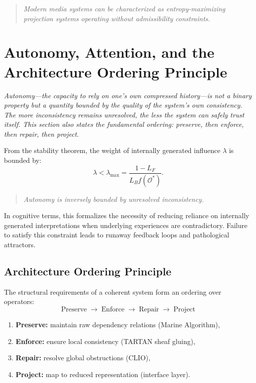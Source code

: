 \documentclass[12pt,a4paper]{article}
\begin{document}
\begin{quote}
\emph{Modern media systems can be characterized as entropy-maximizing projection systems operating without admissibility constraints.}
\end{quote}

\section{Autonomy, Attention, and the Architecture Ordering Principle}
\label{sec:autonomy}

\textit{Autonomy---the capacity to rely on one's own compressed history---is not a binary property but a quantity bounded by the quality of the system's own consistency. The more inconsistency remains unresolved, the less the system can safely trust itself. This section also states the fundamental ordering: preserve, then enforce, then repair, then project.}

From the stability theorem, the weight of internally generated influence $\lambda$ is bounded by:
\[
\lambda < \lambda_{\max} = \frac{1 - L_F}{L_B f(\mathcal{O}^*)}.
\]

\begin{quote}
\emph{Autonomy is inversely bounded by unresolved inconsistency.}
\end{quote}

In cognitive terms, this formalizes the necessity of reducing reliance on internally generated interpretations when underlying experiences are contradictory. Failure to satisfy this constraint leads to runaway feedback loops and pathological attractors.

\subsection{Architecture Ordering Principle}

The structural requirements of a coherent system form an ordering over operators:
\[
\text{Preserve} \;\to\; \text{Enforce} \;\to\; \text{Repair} \;\to\; \text{Project}
\]

\begin{enumerate}[noitemsep]
\item \textbf{Preserve:} maintain raw dependency relations (Marine Algorithm),
\item \textbf{Enforce:} ensure local consistency (TARTAN sheaf gluing),
\item \textbf{Repair:} resolve global obstructions (CLIO),
\item \textbf{Project:} map to reduced representation (interface layer).
\end{enumerate}
\end{document}
